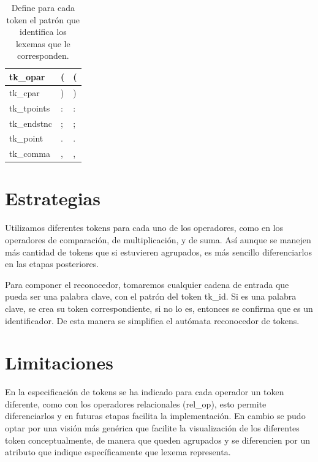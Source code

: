 \begin{table}[H]
\begin{tabular}{|l|l|l|}
tk\_opar      & (                                                    & (                    \\ \hline
tk\_cpar      & )                                                    & )                    \\ \hline
tk\_tpoints   & :                                                    & :                    \\ \hline
tk\_endstnc   & ;                                                    & ;                    \\ \hline
tk\_point     & .                                                    & .                    \\ \hline
tk\_comma     & ,                                                    & ,                    \\ \hline
\end{tabular}
\caption{Define para cada token el patrón que identifica los lexemas que le corresponden.}
\label{tab:tabla_token}
\end{table}

\section{Estrategias}
Utilizamos diferentes tokens para cada uno de los operadores, como en los operadores de comparación, de multiplicación, y de suma. Así aunque se manejen más cantidad de tokens que si estuvieren agrupados, es más sencillo diferenciarlos en las etapas posteriores.

Para componer el reconocedor, tomaremos cualquier cadena de entrada que pueda ser una palabra clave, con el patrón del token tk\_id. Si es una palabra clave, se crea su token correspondiente, si no lo es, entonces se confirma que es un identificador. De esta manera se simplifica el autómata reconocedor de tokens.

\section{Limitaciones}
\label{sec:lexico_limitaciones}
En la especificación de tokens se ha indicado para cada operador un token diferente, como con los operadores relacionales (rel\_op), esto permite diferenciarlos y en futuras etapas facilita la implementación. En cambio se pudo optar por una visión más genérica que facilite la visualización de los diferentes token conceptualmente, de manera que queden agrupados y se diferencien por un atributo que indique específicamente que lexema representa.

